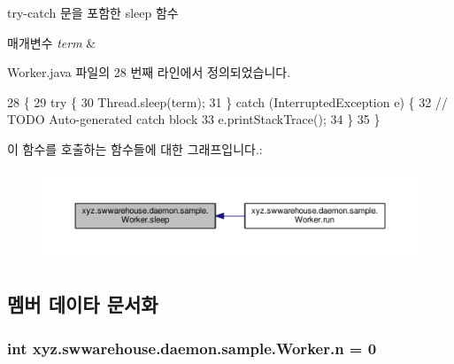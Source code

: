 try-\/catch 문을 포함한 sleep 함수 


\begin{DoxyParams}{매개변수}
{\em term} & \\
\hline
\end{DoxyParams}


Worker.\-java 파일의 28 번째 라인에서 정의되었습니다.


\begin{DoxyCode}
28                                   \{
29         \textcolor{keywordflow}{try} \{
30             Thread.sleep(term);
31         \} \textcolor{keywordflow}{catch} (InterruptedException e) \{
32             \textcolor{comment}{// TODO Auto-generated catch block}
33             e.printStackTrace();
34         \}
35     \}
\end{DoxyCode}


이 함수를 호출하는 함수들에 대한 그래프입니다.\-:
\nopagebreak
\begin{figure}[H]
\begin{center}
\leavevmode
\includegraphics[width=350pt]{classxyz_1_1swwarehouse_1_1daemon_1_1sample_1_1_worker_ae9991783aa9ada529a18ecb5abdb4ad7_icgraph}
\end{center}
\end{figure}




\subsection{멤버 데이타 문서화}
\hypertarget{classxyz_1_1swwarehouse_1_1daemon_1_1sample_1_1_worker_aba3c26c1febb4e19bfc9562306bcee80}{
\subsubsection[{n}]{\setlength{\rightskip}{0pt plus 5cm}int xyz.\-swwarehouse.\-daemon.\-sample.\-Worker.\-n = 0\hspace{0.3cm}{\ttfamily [private]}}}\label{classxyz_1_1swwarehouse_1_1daemon_1_1sample_1_1_worker_aba3c26c1febb4e19bfc9562306bcee80}


